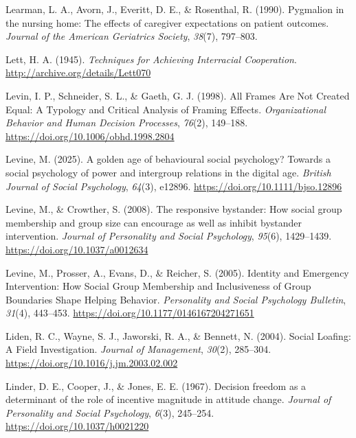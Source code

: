 \documentclass[
  letterpaper,
]{book}
\newlength{\cslhangindent}
\newenvironment{CSLReferences}[2] %
 {\begin{list}{}{%
  \setlength{\itemindent}{0pt}
  \setlength{\leftmargin}{0pt}
  \setlength{\parsep}{0pt}
  \ifodd #1
   \setlength{\leftmargin}{\cslhangindent}
   \setlength{\itemindent}{-1\cslhangindent}
  \fi
  \setlength{\itemsep}{#2\baselineskip}}}
 {\end{list}}
\begin{document}
\begin{CSLReferences}{1}{0}
Learman, L. A., Avorn, J., Everitt, D. E., \& Rosenthal, R. (1990).
Pygmalion in the nursing home: The effects of caregiver expectations on
patient outcomes. \emph{Journal of the American Geriatrics Society},
\emph{38}(7), 797--803.

Lett, H. A. (1945). \emph{Techniques for {Achieving} {Interracial}
{Cooperation}}. \url{http://archive.org/details/Lett070}

Levin, I. P., Schneider, S. L., \& Gaeth, G. J. (1998). All {Frames}
{Are} {Not} {Created} {Equal}: {A} {Typology} and {Critical} {Analysis}
of {Framing} {Effects}. \emph{Organizational Behavior and Human Decision
Processes}, \emph{76}(2), 149--188.
\url{https://doi.org/10.1006/obhd.1998.2804}

Levine, M. (2025). A golden age of behavioural social psychology?
{Towards} a social psychology of power and intergroup relations in the
digital age. \emph{British Journal of Social Psychology}, \emph{64}(3),
e12896. \url{https://doi.org/10.1111/bjso.12896}

Levine, M., \& Crowther, S. (2008). The responsive bystander: {How}
social group membership and group size can encourage as well as inhibit
bystander intervention. \emph{Journal of Personality and Social
Psychology}, \emph{95}(6), 1429--1439.
\url{https://doi.org/10.1037/a0012634}

Levine, M., Prosser, A., Evans, D., \& Reicher, S. (2005). Identity and
{Emergency} {Intervention}: {How} {Social} {Group} {Membership} and
{Inclusiveness} of {Group} {Boundaries} {Shape} {Helping} {Behavior}.
\emph{Personality and Social Psychology Bulletin}, \emph{31}(4),
443--453. \url{https://doi.org/10.1177/0146167204271651}

Liden, R. C., Wayne, S. J., Jaworski, R. A., \& Bennett, N. (2004).
Social {Loafing}: {A} {Field} {Investigation}. \emph{Journal of
Management}, \emph{30}(2), 285--304.
\url{https://doi.org/10.1016/j.jm.2003.02.002}

Linder, D. E., Cooper, J., \& Jones, E. E. (1967). {Decision freedom as
a determinant of the role of incentive magnitude in attitude change}.
\emph{{Journal of Personality and Social Psychology}}, \emph{6}(3),
245--254. \url{https://doi.org/10.1037/h0021220}


\end{CSLReferences}
\end{document}
